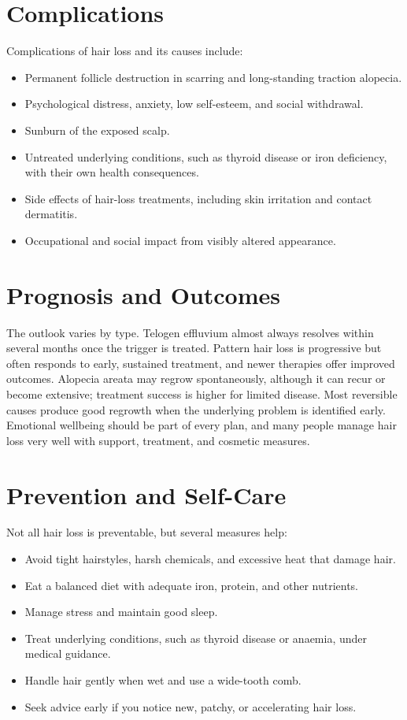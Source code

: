 \section*{Complications}
Complications of hair loss and its causes include:

\begin{itemize}
    \item Permanent follicle destruction in scarring and long-standing traction alopecia.
    \item Psychological distress, anxiety, low self-esteem, and social withdrawal.
    \item Sunburn of the exposed scalp.
    \item Untreated underlying conditions, such as thyroid disease or iron deficiency, with their own health consequences.
    \item Side effects of hair-loss treatments, including skin irritation and contact dermatitis.
    \item Occupational and social impact from visibly altered appearance.
\end{itemize}

\section*{Prognosis and Outcomes}
The outlook varies by type. Telogen effluvium almost always resolves within several months once the trigger is treated. Pattern hair loss is progressive but often responds to early, sustained treatment, and newer therapies offer improved outcomes. Alopecia areata may regrow spontaneously, although it can recur or become extensive; treatment success is higher for limited disease. Most reversible causes produce good regrowth when the underlying problem is identified early. Emotional wellbeing should be part of every plan, and many people manage hair loss very well with support, treatment, and cosmetic measures.

\section*{Prevention and Self-Care}
Not all hair loss is preventable, but several measures help:

\begin{itemize}
    \item Avoid tight hairstyles, harsh chemicals, and excessive heat that damage hair.
    \item Eat a balanced diet with adequate iron, protein, and other nutrients.
    \item Manage stress and maintain good sleep.
    \item Treat underlying conditions, such as thyroid disease or anaemia, under medical guidance.
    \item Handle hair gently when wet and use a wide-tooth comb.
    \item Seek advice early if you notice new, patchy, or accelerating hair loss.
\end{itemize}

